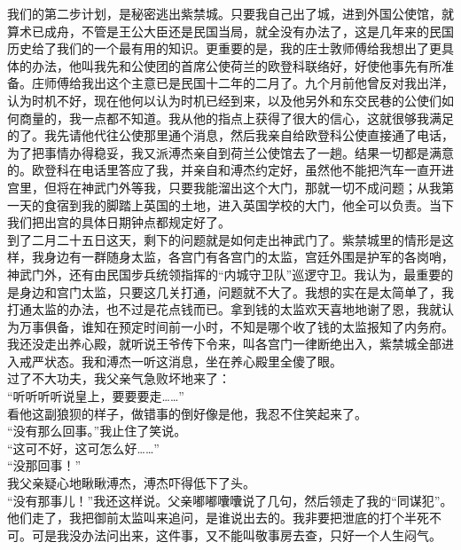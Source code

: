我们的第二步计划，是秘密逃出紫禁城。只要我自己出了城，进到外国公使馆，就算术已成舟，不管是王公大臣还是民国当局，就全没有办法了，这是几年来的民国历史给了我们的一个最有用的知识。更重要的是，我的庄士敦师傅给我想出了更具体的办法，他叫我先和公使团的首席公使荷兰的欧登科联络好，好使他事先有所准备。庄师傅给我出这个主意已是民国十二年的二月了。九个月前他曾反对我出洋，认为时机不好，现在他何以认为时机已经到来，以及他另外和东交民巷的公使们如何商量的，我一点都不知道。我从他的指点上获得了很大的信心，这就很够我满足的了。我先请他代往公使那里通个消息，然后我亲自给欧登科公使直接通了电话，为了把事情办得稳妥，我又派溥杰亲自到荷兰公使馆去了一趟。结果一切都是满意的。欧登科在电话里答应了我，并亲自和溥杰约定好，虽然他不能把汽车一直开进宫里，但将在神武门外等我，只要我能溜出这个大门，那就一切不成问题；从我第一天的食宿到我的脚踏上英国的土地，进入英国学校的大门，他全可以负责。当下我们把出宫的具体日期钟点都规定好了。\\

到了二月二十五日这天，剩下的问题就是如何走出神武门了。紫禁城里的情形是这样，我身边有一群随身太监，各宫门有各宫门的太监，宫廷外围是护军的各岗哨，神武门外，还有由民国步兵统领指挥的“内城守卫队”巡逻守卫。我认为，最重要的是身边和宫门太监，只要这几关打通，问题就不大了。我想的实在是太简单了，我打通太监的办法，也不过是花点钱而已。拿到钱的太监欢天喜地地谢了恩，我就认为万事俱备，谁知在预定时间前一小时，不知是哪个收了钱的太监报知了内务府。我还没走出养心殿，就听说王爷传下令来，叫各宫门一律断绝出入，紫禁城全部进入戒严状态。我和溥杰一听这消息，坐在养心殿里全傻了眼。\\

过了不大功夫，我父亲气急败坏地来了：\\

“听听听听说皇上，要要要走……”\\

看他这副狼狈的样子，做错事的倒好像是他，我忍不住笑起来了。\\

“没有那么回事。”我止住了笑说。\\

“这可不好，这可怎么好……”\\

“没那回事！”\\

我父亲疑心地瞅瞅溥杰，溥杰吓得低下了头。\\

“没有那事儿！”我还这样说。父亲嘟嘟囔囔说了几句，然后领走了我的“同谋犯”。他们走了，我把御前太监叫来追问，是谁说出去的。我非要把泄底的打个半死不可。可是我没办法问出来，这件事，又不能叫敬事房去查，只好一个人生闷气。\\

